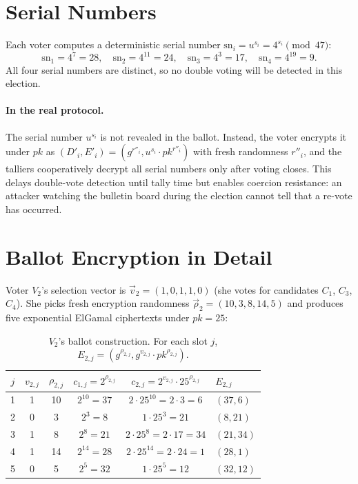 \documentclass[12pt,a4paper,oneside]{report}
\begin{document}
\section{Serial Numbers}
\label{sec:byhand-serial}

Each voter computes a deterministic serial number $\text{sn}_i = u^{s_i} = 4^{s_i} \pmod{47}$:
\[
    \text{sn}_1 = 4^7 = 28, \quad
    \text{sn}_2 = 4^{11} = 24, \quad
    \text{sn}_3 = 4^3 = 17, \quad
    \text{sn}_4 = 4^{19} = 9.
\]
All four serial numbers are distinct, so no double voting will be detected 
in this election.

\paragraph{In the real protocol.}
The serial number $u^{s_i}$ is not revealed in the ballot. Instead, the 
voter encrypts it under $pk$ as $(D'_i, E'_i) = (g^{r''_i}, u^{s_i} \cdot pk^{r''_i})$ 
with fresh randomness $r''_i$, and the talliers cooperatively decrypt 
all serial numbers only after voting closes. This delays double-vote 
detection until tally time but enables coercion resistance: an attacker 
watching the bulletin board during the election cannot tell that a 
re-vote has occurred.

\section{Ballot Encryption in Detail}
\label{sec:byhand-encryption}

Voter $V_2$'s selection vector is $\vec{v}_2 = (1, 0, 1, 1, 0)$ (she votes 
for candidates $C_1$, $C_3$, $C_4$). She picks fresh encryption randomness 
$\vec{\rho}_2 = (10, 3, 8, 14, 5)$ and produces five exponential ElGamal 
ciphertexts under $pk = 25$:

\begin{table}[H]
\centering
\caption{$V_2$'s ballot construction. For each slot $j$, 
$E_{2, j} = (g^{\rho_{2, j}}, g^{v_{2, j}} \cdot pk^{\rho_{2, j}})$.}
\label{tab:byhand-v2-ballot}
\small
\begin{tabular}{cccccl}
\toprule
$j$ & $v_{2, j}$ & $\rho_{2, j}$ & $c_{1, j} = 2^{\rho_{2, j}}$ & 
$c_{2, j} = 2^{v_{2, j}} \cdot 25^{\rho_{2, j}}$ & $E_{2, j}$ \\
\midrule
1 & 1 & 10 & $2^{10} = 37$ & $2 \cdot 25^{10} = 2 \cdot 3 = 6$ & $(37, 6)$ \\
2 & 0 & 3  & $2^3 = 8$     & $1 \cdot 25^3 = 21$               & $(8, 21)$ \\
3 & 1 & 8  & $2^8 = 21$    & $2 \cdot 25^8 = 2 \cdot 17 = 34$  & $(21, 34)$ \\
4 & 1 & 14 & $2^{14} = 28$ & $2 \cdot 25^{14} = 2 \cdot 24 = 1$ & $(28, 1)$ \\
5 & 0 & 5  & $2^5 = 32$    & $1 \cdot 25^5 = 12$               & $(32, 12)$ \\
\bottomrule
\end{tabular}
\end{table}
\end{document}
